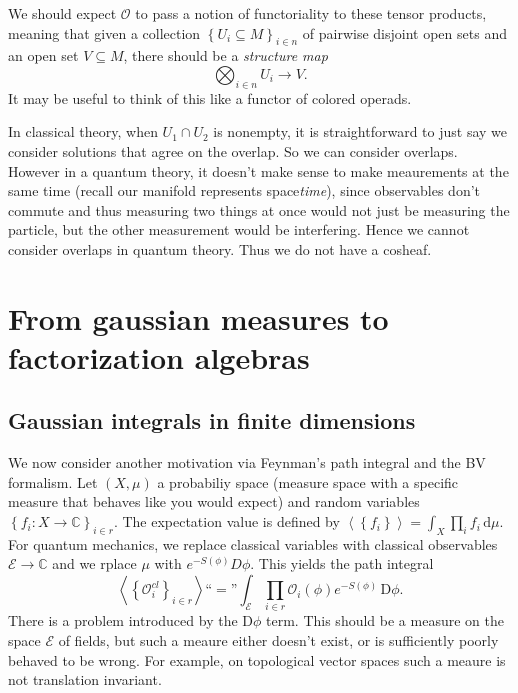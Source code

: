 We should expect $\mathcal{O} $ to pass a notion of functoriality to these tensor products, meaning that given a collection $\left\{ U_i\subseteq M \right\} _{i\in n} $ of pairwise disjoint open sets and an open set $V\subseteq M$, there should be a \emph{structure map}
\[
	\bigotimes_{i\in n} U_i \to V
.\]
It may be useful to think of this like a functor of colored operads.

In classical theory, when $U_1 \cap U_2$ is nonempty, it is straightforward to just say we consider solutions that agree on the overlap. So we can consider overlaps. However in a quantum theory, it doesn't make sense to make meaurements at the same time (recall our manifold represents space\emph{time}), since observables don't commute and thus measuring two things at once would not just be measuring the particle, but the other measurement would be interfering. Hence we cannot consider overlaps in quantum theory. Thus we do not have a cosheaf.

\chapter{From gaussian measures to factorization algebras}

\section{Gaussian integrals in finite dimensions}

We now consider another motivation via Feynman's path integral and the BV formalism. Let $(X,\mu )$ a probabiliy space (measure space with a specific measure that behaves like you would expect) and random variables $\left\{ f_i : X \to \mathbb{C}  \right\} _{i\in r} $. The expectation value is defined by $\left\langle \left\{ f_i \right\}  \right\rangle =\int _X \prod_{i} f_i\,\mathrm{d} \mu $. For quantum mechanics, we replace classical variables with classical observables $\mathcal{E} \to \mathbb{C} $ and we rplace $\mu $ with $e^{-S(\phi )} D \phi $. This yields the path integral
\[
	\left\langle \left\{ \mathcal{O} _i^{cl}  \right\} _{i\in r}  \right\rangle \text{``}=\text{''} \int_\mathcal{E} \prod_{i\in r} \mathcal{O} _i(\phi )e^{-S(\phi )}  \,\mathrm{D}\phi 
.\]
There is a problem introduced by the $\mathrm{D} \phi $ term. This should be a measure on the space $\mathcal{E} $ of fields, but such a meaure either doesn't exist, or is sufficiently poorly behaved to be wrong. For example, on topological vector spaces such a meaure is not translation invariant.

